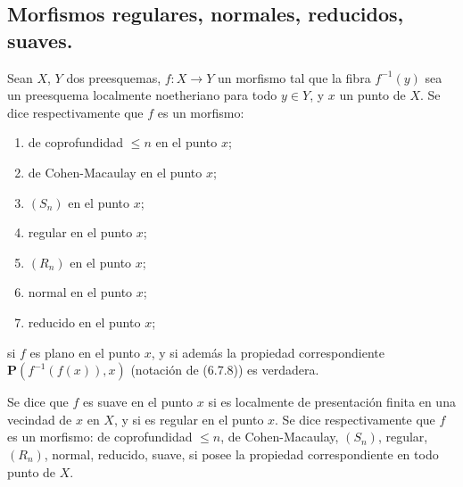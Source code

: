 \subsection{Morfismos regulares, normales, reducidos, suaves.}
\label{subsection:IV.6.8}

\begin{definition}[6.8.1]
\label{IV.2.s6.8.1-fr}
Sean $X$, $Y$ dos preesquemas, $f:X\to Y$ un morfismo tal que la fibra
$f^{-1}(y)$ sea un preesquema localmente noetheriano para todo $y\in Y$, y $x$
un punto de $X$. Se dice respectivamente que $f$ es un morfismo:
\begin{enumerate}
\item[\textup{(i)}] de coprofundidad $\leq n$ en el punto $x$;
\item[\textup{(ii)}] de Cohen-Macaulay en el punto $x$;
\item[\textup{(iii)}] $(S_n)$ en el punto $x$;
\item[\textup{(iv)}] regular en el punto $x$;
\item[\textup{(v)}] $(R_n)$ en el punto $x$;
\item[\textup{(vi)}] normal en el punto $x$;
\item[\textup{(vii)}] reducido en el punto $x$;
\end{enumerate}
si $f$ es plano en el punto $x$, y si además la propiedad correspondiente
$\boldsymbol{P}(f^{-1}(f(x)),x)$ (notación de \textup{(6.7.8)}) es verdadera.

Se dice que $f$ es suave en el punto $x$ si es localmente de presentación finita
en una vecindad de $x$ en $X$, y si es regular en el punto $x$. Se dice
respectivamente que $f$ es un morfismo: de coprofundidad $\leq n$, de
Cohen-Macaulay, $(S_n)$, regular, $(R_n)$, normal, reducido, suave, si posee la
propiedad correspondiente en todo punto de $X$.
\end{definition}
